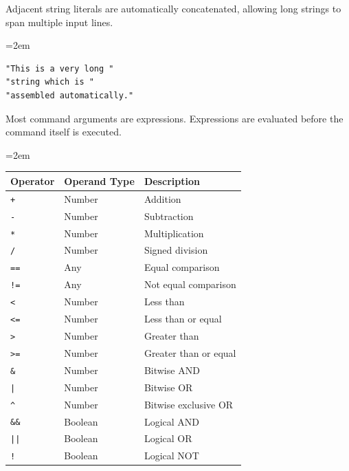 Adjacent string literals are automatically concatenated, allowing long strings to span multiple input lines.

\begin{list}{}{\leftmargin=2em}
\item
\begin{verbatim}
"This is a very long "
"string which is "
"assembled automatically."
\end{verbatim}
\end{list}


Most command arguments are expressions. Expressions are evaluated before the command itself is executed.

\begin{list}{}{\leftmargin=2em}
\item
\begin{tabular}{lll}
\textbf{Operator} & \textbf{Operand Type} & \textbf{Description} \\ \hline
\verb|+|  & Number           & Addition \\
\verb|-|  & Number           & Subtraction \\
\verb|*|  & Number           & Multiplication \\
\verb|/|  & Number           & Signed division \\[2mm]

\verb|==| & Any              & Equal comparison \\
\verb|!=| & Any              & Not equal comparison \\
\verb|<|  & Number           & Less than \\
\verb|<=| & Number           & Less than or equal \\
\verb|>|  & Number           & Greater than \\
\verb|>=| & Number           & Greater than or equal \\[2mm]

\verb|&|  & Number           & Bitwise AND \\
\verb!|!  & Number           & Bitwise OR \\
\verb|^|  & Number           & Bitwise exclusive OR \\[2mm]

\verb|&&| & Boolean          & Logical AND \\
\verb+||+ & Boolean          & Logical OR \\
\verb|!|  & Boolean          & Logical NOT \\
\end{tabular}
\end{list}

